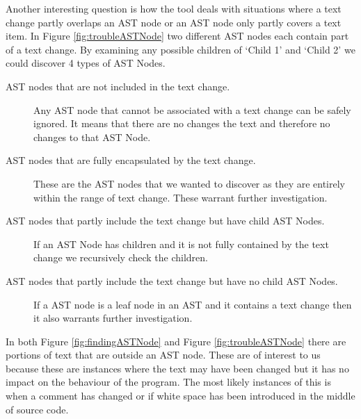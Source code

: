 Another interesting question is how the tool deals with situations where a text change partly overlaps an AST node or an AST node only partly covers a text item.  
In Figure \ref{fig:troubleASTNode} two different AST nodes each contain part of a text change. 
By examining any possible children of `Child 1' and `Child 2' we could discover 4 types of AST Nodes.
\begin{description}

  \item [AST nodes that are not included in the text change.]
    Any AST node that cannot be associated with a text change can be safely ignored. It means that there are no changes the text and therefore no changes to that AST Node.
  \item [AST nodes that are fully encapsulated by the text change.] 
    These are the AST nodes that we wanted to discover as they are entirely within the range of text change.  These warrant further investigation.
  \item [AST nodes that partly include the text change but have child AST Nodes.]
    If an AST Node has children and it is not fully contained by the text change we recursively check the children.
  \item [AST nodes that partly include the text change but have no child AST Nodes.]
    If a AST node is a leaf node in an AST and it contains a text change then it also warrants further investigation.       
\end{description}

In both Figure \ref{fig:findingASTNode} and Figure \ref{fig:troubleASTNode} there are portions of text that are outside an AST node.  These are of interest to us because these are instances where the text may have been changed but it has no impact on the behaviour of the program.  The most likely instances of this is when a comment has changed or if white space has been introduced in the middle of source code.

% 

% 

